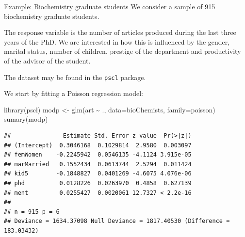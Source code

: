 \documentclass[
  ignorenonframetext,
]{beamer}
\newenvironment{Shaded}{\begin{snugshade}}{\end{snugshade}}
\newcommand{\AttributeTok}[1]{\textcolor[rgb]{0.77,0.63,0.00}{#1}}
\newcommand{\FunctionTok}[1]{\textcolor[rgb]{0.00,0.00,0.00}{#1}}
\newcommand{\NormalTok}[1]{#1}
\newcommand{\OtherTok}[1]{\textcolor[rgb]{0.56,0.35,0.01}{#1}}
\newcommand{\SpecialCharTok}[1]{\textcolor[rgb]{0.00,0.00,0.00}{#1}}
\begin{document}
\begin{frame}{Example: Biochemistry graduate students}
\protect\hypertarget{example-biochemistry-graduate-students}{}
We consider a sample of 915 biochemistry graduate students.

\vspace{12pt}

The response variable is the number of articles produced during the last
three years of the PhD. \vspace{12pt} We are interested in how this is
influenced by the gender, marital status, number of children, prestige
of the department and productivity of the advisor of the student.

\vspace{12pt}

The dataset may be found in the \texttt{pscl} package.
\end{frame}

\begin{frame}[fragile]{}
\protect\hypertarget{section-36}{}
We start by fitting a Poisson regression model:

\vspace{12pt}
\tiny

\begin{Shaded}
\begin{Highlighting}[]
\FunctionTok{library}\NormalTok{(pscl)}
\NormalTok{modp }\OtherTok{\textless{}{-}} \FunctionTok{glm}\NormalTok{(art }\SpecialCharTok{\textasciitilde{}}\NormalTok{ ., }\AttributeTok{data=}\NormalTok{bioChemists, }\AttributeTok{family=}\NormalTok{poisson)}
\FunctionTok{sumary}\NormalTok{(modp)}
\end{Highlighting}
\end{Shaded}

\begin{verbatim}
##               Estimate Std. Error z value  Pr(>|z|)
## (Intercept)  0.3046168  0.1029814  2.9580  0.003097
## femWomen    -0.2245942  0.0546135 -4.1124 3.915e-05
## marMarried   0.1552434  0.0613744  2.5294  0.011424
## kid5        -0.1848827  0.0401269 -4.6075 4.076e-06
## phd          0.0128226  0.0263970  0.4858  0.627139
## ment         0.0255427  0.0020061 12.7327 < 2.2e-16
## 
## n = 915 p = 6
## Deviance = 1634.37098 Null Deviance = 1817.40530 (Difference = 183.03432)
\end{verbatim}
\end{frame}
\end{document}
